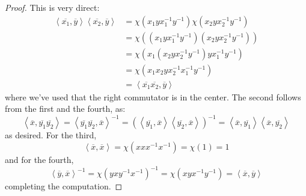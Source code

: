 \begin{proof}
	This is very direct:
	\begin{align*}
	\left<\overline{x_1},\overline{y}\right>\left<\overline{x_2},\overline{y}\right>
		&= \chi(x_1yx_1^{-1}y^{-1})\chi(x_2yx_2^{-1}y^{-1}) \\
		&= \chi((x_1yx_1^{-1}y^{-1})(x_2yx_2^{-1}y^{-1})) \\
		&= \chi(x_1(x_2yx_2^{-1}y^{-1})yx_1^{-1}y^{-1}) \\
		&= \chi(x_1x_2yx_2^{-1}x_1^{-1}y^{-1}) \\
		&= \left<\overline{x_1}\overline{x_2},\overline{y}\right>
	\end{align*}
	where we've used that the right commutator is in the center. The second follows from the first and the fourth, as:
	\[ \left<\overline{x},\overline{y_1}\overline{y_2}\right> = \left<\overline{y_1}\overline{y_2},\overline{x}\right>^{-1} = \left(\left<\overline{y_1},\overline{x}\right>\left<\overline{y_2},\overline{x}\right>\right)^{-1} = \left<\overline{x},\overline{y_1}\right>\left<\overline{x},\overline{y_2}\right> \]
	as desired. For the third,
	\[ \left<\overline{x},\overline{x}\right> = \chi(xxx^{-1}x^{-1}) = \chi(1) = 1 \]
	and for the fourth,
	\[ \left<\overline{y},\overline{x}\right>^{-1} = \chi(yxy^{-1}x^{-1})^{-1} = \chi(xyx^{-1}y^{-1}) = \left<\overline{x},\overline{y}\right> \]
	completing the computation.
\end{proof}
